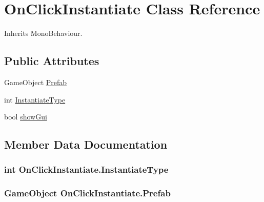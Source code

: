 \hypertarget{class_on_click_instantiate}{}\section{On\+Click\+Instantiate Class Reference}
\label{class_on_click_instantiate}


Inherits Mono\+Behaviour.

\subsection*{Public Attributes}
\begin{DoxyCompactItemize}
\item 
Game\+Object \hyperlink{class_on_click_instantiate_a4aefd39959a96154a9f5a9249d38be90}{Prefab}
\item 
int \hyperlink{class_on_click_instantiate_a1e3b8dfd6e6222b1f1e5a951d38cc1b5}{Instantiate\+Type}
\item 
bool \hyperlink{class_on_click_instantiate_ae42e02f90b1f85076f4c085521951fdf}{show\+Gui}
\end{DoxyCompactItemize}


\subsection{Member Data Documentation}
\subsubsection[{\texorpdfstring{Instantiate\+Type}{InstantiateType}}]{\setlength{\rightskip}{0pt plus 5cm}int On\+Click\+Instantiate.\+Instantiate\+Type}\hypertarget{class_on_click_instantiate_a1e3b8dfd6e6222b1f1e5a951d38cc1b5}{}\label{class_on_click_instantiate_a1e3b8dfd6e6222b1f1e5a951d38cc1b5}
\subsubsection[{\texorpdfstring{Prefab}{Prefab}}]{\setlength{\rightskip}{0pt plus 5cm}Game\+Object On\+Click\+Instantiate.\+Prefab}\hypertarget{class_on_click_instantiate_a4aefd39959a96154a9f5a9249d38be90}{}\label{class_on_click_instantiate_a4aefd39959a96154a9f5a9249d38be90}
